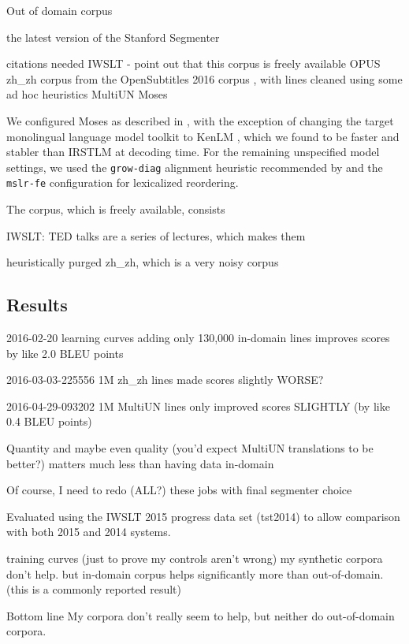 Out of domain corpus

the latest version of the Stanford Segmenter 

citations needed
IWSLT  - point out that this corpus is freely available
OPUS 
zh\_zh corpus from the OpenSubtitles 2016 corpus , with lines cleaned using some ad hoc heuristics
MultiUN 
Moses 

We configured Moses as described in , with the exception of changing the target monolingual language model toolkit to KenLM , which we found to be faster and stabler than IRSTLM  at decoding time.
For the remaining unspecified model settings, we used the {\small \tt grow-diag} alignment heuristic recommended by  and the {\small \tt mslr-fe} configuration for lexicalized reordering.

The corpus, which is freely available, consists 

IWSLT: TED talks are a series of lectures, which makes them 



heuristically purged zh\_zh, which is a very noisy corpus

\subsection{Results}

2016-02-20 learning curves adding only 130,000 in-domain lines improves scores by like 2.0 BLEU points

2016-03-03-225556 1M zh\_zh lines made scores slightly WORSE?

2016-04-29-093202 1M MultiUN lines only improved scores SLIGHTLY (by like 0.4 BLEU points)

Quantity and maybe even quality (you'd expect MultiUN translations to be better?) matters much less than having data in-domain

Of course, I need to redo (ALL?) these jobs with final segmenter choice

Evaluated using the IWSLT 2015 progress data set (tst2014) to allow comparison with both 2015 and 2014 systems.

training curves (just to prove my controls aren't wrong)
my synthetic corpora don't help. 
but in-domain corpus helps significantly more than out-of-domain. (this is a commonly reported result)

Bottom line
My corpora don't really seem to help, but neither do out-of-domain corpora.

